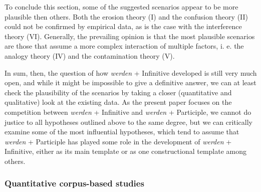 \documentclass[output=paper,colorlinks,citecolor=brown]{langscibook}
\begin{document}
To conclude this section, some of the suggested scenarios appear to be more plausible then others. Both the erosion theory (I) and the confusion theory (II) could not be confirmed by empirical data, as is the case with the interference theory (VI). Generally, the prevailing opinion is that the most plausible scenarios are those  that assume a more complex interaction of multiple factors, i. e.  the analogy theory (IV) and the contamination theory (V).

In sum, then, the question of how \textit{werden} + Infinitive developed is still very much open, and while it might be impossible to give a definitive answer, we can at least check the plausibility of the scenarios by taking a closer (quantitative and qualitative) look at the existing data. As the present paper focuses on the competition between \textit{werden} + Infinitive and \textit{werden} + Participle, we cannot do justice to all hypotheses outlined above to the same degree, but we can critically examine some of the most influential hypotheses, which tend to assume that \textit{werden} + Participle has played some role in the development of \textit{werden} + Infinitive, either as its main template or as one constructional template among others.
 

\subsubsection{Quantitative corpus-based studies} \label{sec:hs:quant}
\end{document}
